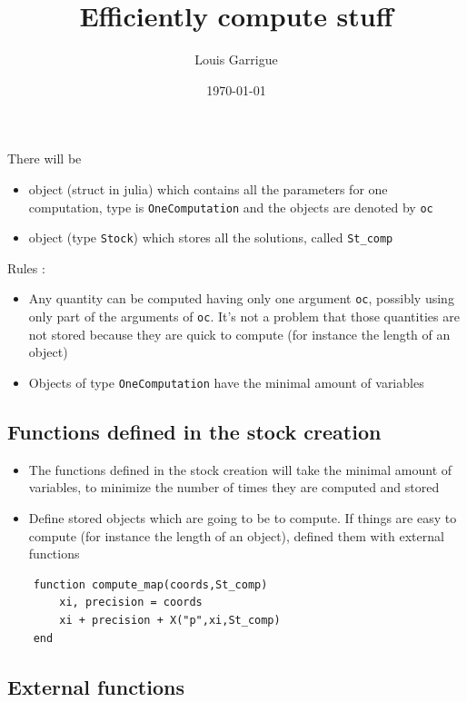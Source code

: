 \documentclass[11pt,a4paper,reqno,french,tikz]{amsart}
\title[]{Efficiently compute stuff}
\author[L. Garrigue]{Louis Garrigue}
\date{\today}
\begin{document}
\maketitle

There will be
\begin{itemize}
\item object (struct in julia) which contains all the parameters for one computation, type is \texttt{OneComputation} and the objects are denoted by \texttt{oc}
\item object (type \texttt{Stock}) which stores all the solutions, called \texttt{St\_comp}
\end{itemize}
{}
Rules :
\begin{itemize}
\item Any quantity can be computed having only one argument \texttt{oc}, possibly using only part of the arguments of \texttt{oc}. It's not a problem that those quantities are not stored because they are quick to compute (for instance the length of an object)
\item Objects of type \texttt{OneComputation} have the minimal amount of variables
\end{itemize}

\subsection{Functions defined in the stock creation}%
\label{sub:Functions defined in the stock creation}

\begin{itemize}
\item The functions defined in the stock creation will take the minimal amount of variables, to minimize the number of times they are computed and stored
\item Define {\color{red}{only}} stored objects which are going to be {\color{red}{long}} to compute. If things are easy to compute (for instance the length of an object), defined them with external functions
\end{itemize}

\begin{lstlisting} 
	function compute_map(coords,St_comp)
		xi, precision = coords
		xi + precision + X("p",xi,St_comp)
	end
\end{lstlisting}


\subsection{External functions}%
\label{sub:External functions}
\end{document}
